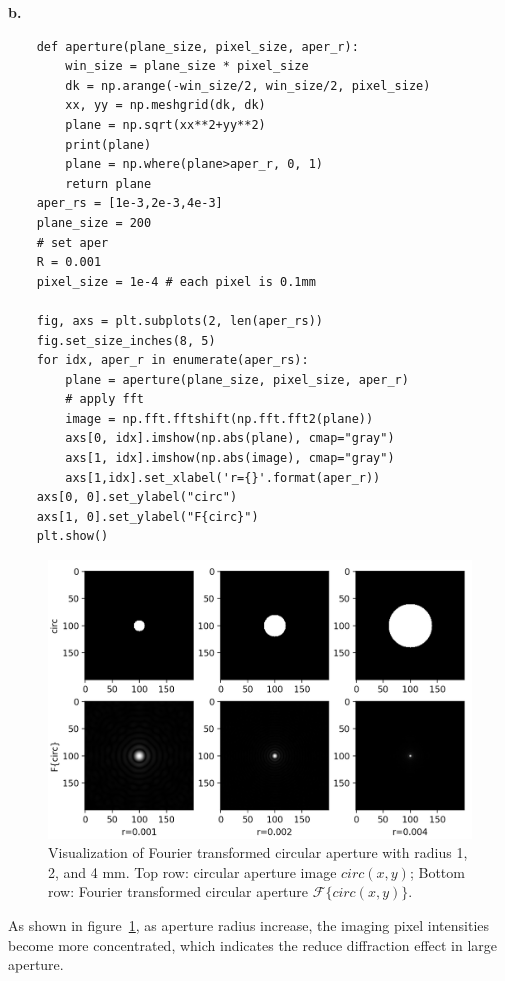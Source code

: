 \documentclass[11pt,a4paper]{article}
\begin{document}
\textbf{b.}
\begin{lstlisting}    
    def aperture(plane_size, pixel_size, aper_r):
        win_size = plane_size * pixel_size
        dk = np.arange(-win_size/2, win_size/2, pixel_size)
        xx, yy = np.meshgrid(dk, dk)
        plane = np.sqrt(xx**2+yy**2)
        print(plane)
        plane = np.where(plane>aper_r, 0, 1)
        return plane
    aper_rs = [1e-3,2e-3,4e-3]
    plane_size = 200 
    # set aper 
    R = 0.001
    pixel_size = 1e-4 # each pixel is 0.1mm

    fig, axs = plt.subplots(2, len(aper_rs))
    fig.set_size_inches(8, 5)
    for idx, aper_r in enumerate(aper_rs):
        plane = aperture(plane_size, pixel_size, aper_r)    
        # apply fft
        image = np.fft.fftshift(np.fft.fft2(plane))
        axs[0, idx].imshow(np.abs(plane), cmap="gray")
        axs[1, idx].imshow(np.abs(image), cmap="gray")
        axs[1,idx].set_xlabel('r={}'.format(aper_r))
    axs[0, 0].set_ylabel("circ")
    axs[1, 0].set_ylabel("F{circ}")
    plt.show()
\end{lstlisting}

\begin{figure}[!htp]
    \centering
    \includegraphics[width=\linewidth]{HW2_Q6_2.png}
    \caption{Visualization of Fourier transformed circular aperture with radius 1, 2, and 4 mm. Top row: circular aperture image $circ(x,y)$; Bottom row: Fourier transformed circular aperture $\mathcal{F}\{circ(x,y)\}$. }
    \label{fig:circ}
\end{figure}
As shown in figure~\ref{fig:circ}, as aperture radius increase, the imaging pixel intensities become more concentrated, which indicates the reduce diffraction effect in large aperture. 
\end{document}
